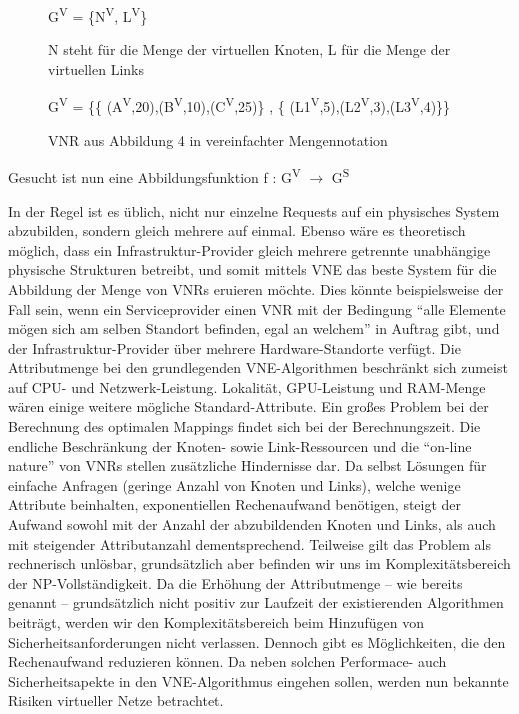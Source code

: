 \documentclass{lni}
\begin{document}
\begin{figure}[htb]
\begin{center}
G\textsuperscript{V} = \{N\textsuperscript{V}, L\textsuperscript{V}\}
\caption{\label{graph5}N steht für die Menge der virtuellen Knoten, L für die Menge der virtuellen Links}
\end{center}
\end{figure}

\begin{figure}[htb]
\begin{center}
G\textsuperscript{V} = \{\{
(A\textsuperscript{V},20),(B\textsuperscript{V},10),(C\textsuperscript{V},25)\} , \{
(L1\textsuperscript{V},5),(L2\textsuperscript{V},3),(L3\textsuperscript{V},4)\}\}
\caption{\label{graph6}VNR aus Abbildung 4 in vereinfachter Mengennotation}
\end{center}
\end{figure}


Gesucht ist nun eine Abbildungsfunktion \hspace{0.2cm} f : G\textsuperscript{V} $\rightarrow$ G\textsuperscript{S}


In der Regel ist es üblich, nicht nur einzelne Requests auf ein physisches System abzubilden, sondern gleich mehrere auf einmal. Ebenso wäre es theoretisch möglich, dass ein Infrastruktur-Provider gleich mehrere getrennte unabhängige physische Strukturen betreibt, und somit mittels VNE das beste System für die Abbildung der Menge von VNRs eruieren möchte. Dies könnte beispielsweise der Fall sein, wenn ein Serviceprovider einen VNR mit der Bedingung "`alle Elemente mögen sich am selben Standort befinden, egal an welchem"' in Auftrag gibt, und der Infrastruktur-Provider über mehrere Hardware-Standorte verfügt.
\newline
Die Attributmenge bei den grundlegenden VNE-Algorithmen beschränkt  sich zumeist auf CPU- und Netzwerk-Leistung. 
Lokalität, GPU-Leistung und RAM-Menge wären einige weitere mögliche Standard-Attribute. Ein großes Problem bei der Berechnung des optimalen Mappings findet sich bei der Berechnungszeit. Die endliche Beschränkung der Knoten- sowie Link-Ressourcen und die "`on-line nature"' von VNRs stellen zusätzliche Hindernisse dar. Da selbst Lösungen für einfache Anfragen (geringe Anzahl von Knoten und Links), welche wenige Attribute beinhalten, exponentiellen Rechenaufwand benötigen, steigt der Aufwand sowohl mit der Anzahl der abzubildenden Knoten und Links, als auch mit steigender Attributanzahl dementsprechend. Teilweise gilt das Problem als rechnerisch unlösbar, grundsätzlich aber befinden wir uns im Komplexitätsbereich der NP-Vollständigkeit. \cite{SVNE2} Da die Erhöhung der Attributmenge -- wie bereits genannt -- grundsätzlich nicht positiv zur Laufzeit der existierenden Algorithmen beiträgt, werden wir den Komplexitätsbereich beim Hinzufügen von Sicherheitsanforderungen nicht verlassen. Dennoch gibt es Möglichkeiten, die den Rechenaufwand reduzieren können. Da neben solchen Performace- auch Sicherheitsapekte in den VNE-Algorithmus eingehen sollen, werden nun bekannte Risiken virtueller Netze betrachtet.
\end{document}

